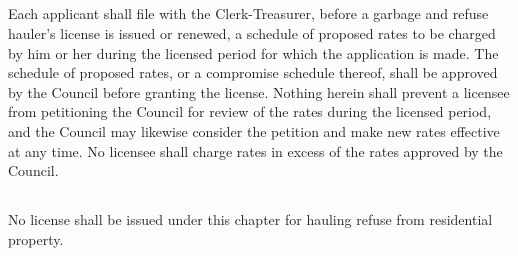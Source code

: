 \subsection{}
Each applicant shall file with the Clerk-Treasurer, before a garbage and refuse hauler’s license is issued or renewed, a schedule of proposed rates to be charged by him or her during the licensed period for which the application is made.  The schedule of proposed rates, or a compromise schedule thereof, shall be approved by the Council before granting the license.  Nothing herein shall prevent a licensee from petitioning the Council for review of the rates during the licensed period, and the Council may likewise consider the petition and make new rates effective at any time.  No licensee shall charge rates in excess of the rates approved by the Council.
\subsection{}
No license shall be issued under this chapter for hauling refuse from residential property.
